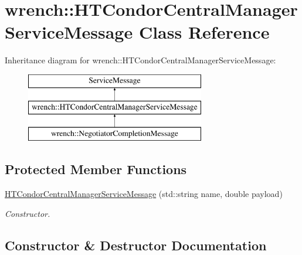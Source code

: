 \hypertarget{classwrench_1_1_h_t_condor_central_manager_service_message}{}\section{wrench\+:\+:H\+T\+Condor\+Central\+Manager\+Service\+Message Class Reference}
\label{classwrench_1_1_h_t_condor_central_manager_service_message}
Inheritance diagram for wrench\+:\+:H\+T\+Condor\+Central\+Manager\+Service\+Message\+:\begin{figure}[H]
\begin{center}
\leavevmode
\includegraphics[height=3.000000cm]{classwrench_1_1_h_t_condor_central_manager_service_message}
\end{center}
\end{figure}
\subsection*{Protected Member Functions}
\begin{DoxyCompactItemize}
\item 
\hyperlink{classwrench_1_1_h_t_condor_central_manager_service_message_a18405b39184680404710905465d3a573}{H\+T\+Condor\+Central\+Manager\+Service\+Message} (std\+::string name, double payload)
\begin{DoxyCompactList}\small\item\em Constructor. \end{DoxyCompactList}\end{DoxyCompactItemize}


\subsection{Constructor \& Destructor Documentation}
\mbox{\label{classwrench_1_1_h_t_condor_central_manager_service_message_a18405b39184680404710905465d3a573}} 
